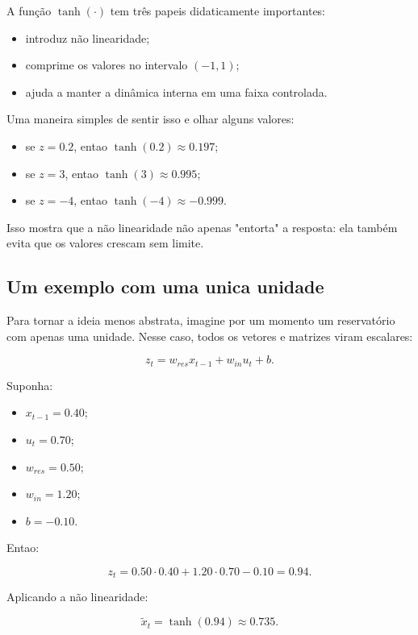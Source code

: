 \documentclass[12pt]{article}
\providecommand{\tightlist}{%
              \setlength{\itemsep}{0pt}\setlength{\parskip}{0pt}}
\begin{document}
A função \(\tanh(\cdot)\) tem três papeis didaticamente importantes:

\begin{itemize}
\tightlist
\item
  introduz não linearidade;
\item
  comprime os valores no intervalo \((-1,1)\);
\item
  ajuda a manter a dinâmica interna em uma faixa controlada.
\end{itemize}

Uma maneira simples de sentir isso e olhar alguns valores:

\begin{itemize}
\tightlist
\item
  se \(z = 0.2\), entao \(\tanh(0.2) \approx 0.197\);
\item
  se \(z = 3\), entao \(\tanh(3) \approx 0.995\);
\item
  se \(z = -4\), entao \(\tanh(-4) \approx -0.999\).
\end{itemize}

Isso mostra que a não linearidade não apenas "entorta" a resposta: ela também evita que os valores crescam sem limite.

\subsection{Um exemplo com uma unica unidade}\label{35-um-exemplo-com-uma-unica-unidade}

Para tornar a ideia menos abstrata, imagine por um momento um reservatório com apenas uma unidade. Nesse caso, todos os vetores e matrizes viram escalares:

\[
z_t = w_{res} x_{t-1} + w_{in} u_t + b.
\]

Suponha:

\begin{itemize}
\tightlist
\item
  \(x_{t-1} = 0.40\);
\item
  \(u_t = 0.70\);
\item
  \(w_{res} = 0.50\);
\item
  \(w_{in} = 1.20\);
\item
  \(b = -0.10\).
\end{itemize}

Entao:

\[
z_t = 0.50 \cdot 0.40 + 1.20 \cdot 0.70 - 0.10 = 0.94.
\]

Aplicando a não linearidade:

\[
\widetilde{x}_t = \tanh(0.94) \approx 0.735.
\]
\end{document}
